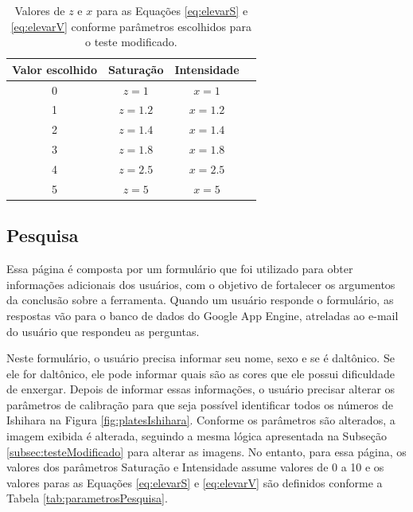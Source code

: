 \documentclass[	12pt, Times, openright, twoside, a4paper, english, brazil]{abntex2}
\begin{document}
\begin{table}[ht]
\centering
\begin{tabular}{cccc}
\hline      
\textbf{Valor escolhido} & \textbf{Saturação} & \textbf{Intensidade}     \\ \hline
0                        & $z = 1$            &  $x = 1$                          \\ \hline
1                        & $z = 1.2$          &  $x = 1.2$                          \\ \hline
2                        & $z = 1.4$          &  $x = 1.4$                          \\ \hline 
3                        & $z = 1.8$          &  $x = 1.8$                          \\ \hline
4                        & $z = 2.5$          &  $x = 2.5$                            \\ \hline
5                        & $z = 5$            &  $x = 5$                           \\ \hline


\end{tabular}
\caption{Valores de $z$ e $x$ para as Equações \ref{eq:elevarS} e \ref{eq:elevarV} conforme parâmetros escolhidos para o teste modificado.}
\label{tab:parametrosCalibracao}
\end{table}

\subsection{Pesquisa}

Essa página é composta por um formulário que foi utilizado para obter informações adicionais dos usuários, com o objetivo de fortalecer os argumentos da conclusão sobre a ferramenta. Quando um usuário responde o formulário, as respostas vão para o banco de dados do Google App Engine, atreladas ao e-mail do usuário que respondeu as perguntas.


Neste formulário, o usuário precisa informar seu nome, sexo e se é daltônico. Se ele for daltônico, ele pode informar quais são as cores que ele possui dificuldade de enxergar. Depois de informar essas informações, o usuário precisar alterar os parâmetros de calibração para que seja possível identificar todos os números de Ishihara na Figura \ref{fig:platesIshihara}. Conforme os parâmetros são alterados, a imagem exibida é alterada, seguindo a mesma lógica apresentada na Subseção \ref{subsec:testeModificado} para alterar as imagens. No entanto, para essa página, os valores dos parâmetros Saturação e Intensidade assume valores de 0 a 10 e os valores paras as Equações \ref{eq:elevarS} e \ref{eq:elevarV} são definidos conforme a Tabela \ref{tab:parametrosPesquisa}. 
\end{document}
